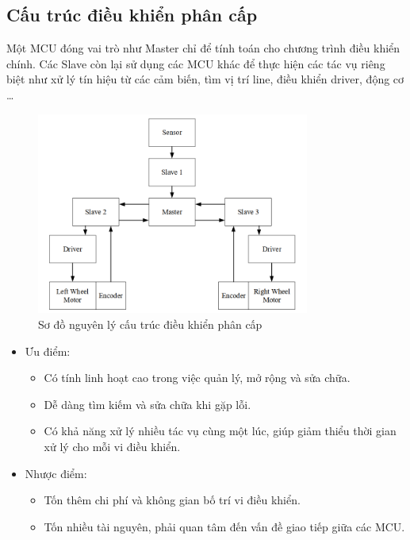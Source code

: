        \subsection{Cấu trúc điều khiển phân cấp}
        \hspace*{0.6cm}Một MCU đóng vai trò như Master chỉ để tính toán cho chương trình điều
        khiển chính. Các Slave còn lại sử dụng các MCU khác để thực hiện các tác vụ riêng biệt
        như xử lý tín hiệu từ các cảm biến, tìm vị trí line, điều khiển driver, động cơ \dots
        \begin{figure}[H]
            \centering
            \includegraphics[width=0.8\textwidth]{pictures/chapter1/chapter1_pic19_phancap.png}
            \caption{Sơ đồ nguyên lý cấu trúc điều khiển phân cấp}
            \label{chap1_pic19}
        \end{figure}
        \begin{itemize}
            \item Ưu điểm: 
            \begin{itemize}[label=\textendash]
                \item Có tính linh hoạt cao trong việc quản lý, mở rộng và sửa chữa.
                \item Dễ dàng tìm kiếm và sửa chữa khi gặp lỗi.
                \item Có khả năng xử lý nhiều tác vụ cùng một lúc, giúp giảm thiểu thời gian xử lý cho mỗi vi điều khiển.
            \end{itemize}
            \item Nhược điểm: 
            \begin{itemize}[label=\textendash]
                \item Tốn thêm chi phí và không gian bố trí vi điều khiển.
                \item Tốn nhiều tài nguyên, phải quan tâm đến vấn đề giao tiếp giữa các MCU.
            \end{itemize}
        \end{itemize}
